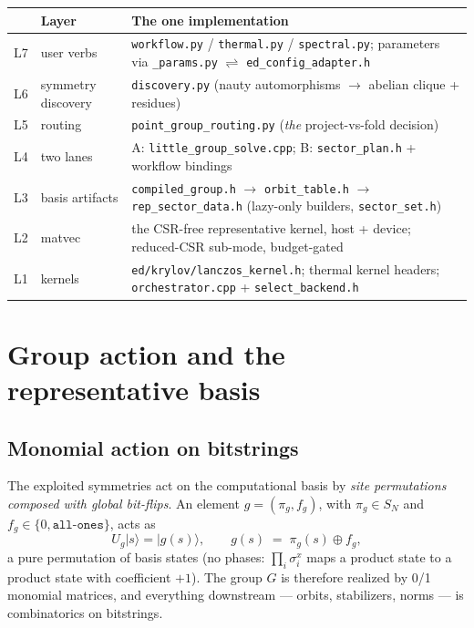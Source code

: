 \documentclass[11pt]{article}
\newcommand{\ket}[1]{|#1\rangle}
\newcommand{\file}[1]{\texttt{\small #1}}
\begin{document}
\begin{center}\small
\begin{tabular}{@{}lll@{}}
\toprule
 & Layer & The one implementation \\
\midrule
L7 & user verbs & \file{workflow.py} / \file{thermal.py} / \file{spectral.py}; parameters via \file{\_params.py} $\rightleftharpoons$ \file{ed\_config\_adapter.h} \\
L6 & symmetry discovery & \file{discovery.py} (nauty automorphisms $\to$ abelian clique + residues) \\
L5 & routing & \file{point\_group\_routing.py} (\emph{the} project-vs-fold decision) \\
L4 & two lanes & A: \file{little\_group\_solve.cpp}; B: \file{sector\_plan.h} + workflow bindings \\
L3 & basis artifacts & \file{compiled\_group.h} $\to$ \file{orbit\_table.h} $\to$ \file{rep\_sector\_data.h} (lazy-only builders, \file{sector\_set.h}) \\
L2 & matvec & the CSR-free representative kernel, host + device; reduced-CSR sub-mode, budget-gated \\
L1 & kernels & \file{ed/krylov/lanczos\_kernel.h}; thermal kernel headers; \file{orchestrator.cpp} + \file{select\_backend.h} \\
\bottomrule
\end{tabular}
\end{center}

\section{Group action and the representative basis}

\subsection{Monomial action on bitstrings}
\label{sec:action}

The exploited symmetries act on the computational basis by \emph{site
permutations composed with global bit-flips}. An element
$g = (\pi_g, f_g)$, with $\pi_g \in S_N$ and $f_g \in \{0, \texttt{all-ones}\}$,
acts as
\[
  U_g \ket{s} = \ket{g(s)}, \qquad
  g(s) \;=\; \pi_g(s) \oplus f_g ,
\]
a pure permutation of basis states (no phases: $\prod_i \sigma^x_i$ maps a
product state to a product state with coefficient $+1$). The group $G$ is
therefore realized by 0/1 monomial matrices, and everything downstream ---
orbits, stabilizers, norms --- is combinatorics on bitstrings.
\end{document}
